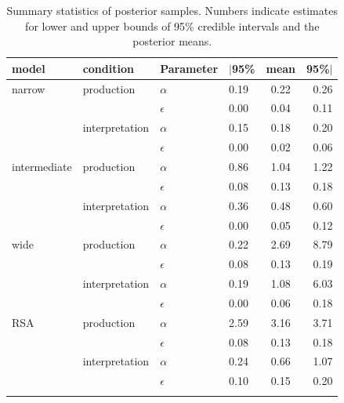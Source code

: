 \documentclass[fleqn]{article}
\begin{document}
\begin{table}[t]
  \centering


  \begin{tabular}{llllcr}
    \toprule \addlinespace[1ex]
    model        & condition      & Parameter  & $|$95\% & mean & 95\%$|$ \\
    \midrule  \addlinespace[1ex]
    narrow       & production     & $\alpha$   & 0.19    & 0.22 & 0.26 \\
                 &                & $\epsilon$ & 0.00    & 0.04 & 0.11 \\
                 & interpretation & $\alpha$   & 0.15    & 0.18 & 0.20 \\
                 &                & $\epsilon$ & 0.00    & 0.02 & 0.06 \\ \addlinespace[0.75ex]
    intermediate & production     & $\alpha$   & 0.86    & 1.04 & 1.22 \\
                 &                & $\epsilon$ & 0.08    & 0.13 & 0.18 \\
                 & interpretation & $\alpha$   & 0.36    & 0.48 & 0.60 \\
                 &                & $\epsilon$ & 0.00    & 0.05 & 0.12 \\ \addlinespace[0.75ex]
    wide         & production     & $\alpha$   & 0.22    & 2.69 & 8.79 \\
                 &                & $\epsilon$ & 0.08    & 0.13 & 0.19 \\
                 & interpretation & $\alpha$   & 0.19    & 1.08 & 6.03 \\
                 &                & $\epsilon$ & 0.00    & 0.06 & 0.18 \\ \addlinespace[0.75ex]
    RSA          & production     & $\alpha$   & 2.59    & 3.16 & 3.71 \\
                 &                & $\epsilon$ & 0.08    & 0.13 & 0.18 \\
                 & interpretation & $\alpha$   & 0.24    & 0.66 & 1.07 \\
                 &                & $\epsilon$ & 0.10    & 0.15 & 0.20 \\ \addlinespace[0.25ex]
    \bottomrule \\
  \end{tabular}

  \caption{
    Summary statistics of posterior samples.
    Numbers indicate estimates for lower and upper bounds of 95\% credible intervals and the posterior means.
  }
  \label{fig:posterior-stats}
\end{table}
\end{document}
